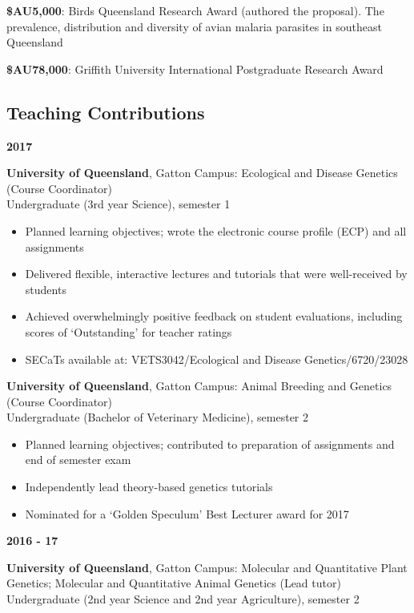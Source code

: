 \documentclass[]{article}
\providecommand{\tightlist}{%
  \setlength{\itemsep}{0pt}\setlength{\parskip}{0pt}}
\begin{document}
\textbf{\$AU5,000}: Birds Queensland Research Award (authored the
proposal). The prevalence, distribution and diversity of avian malaria
parasites in southeast Queensland

\textbf{\$AU78,000}: Griffith University International Postgraduate
Research Award

\subsection{Teaching Contributions}\label{teaching-contributions}

\textbf{2017}

\textbf{University of Queensland}, Gatton Campus: Ecological and Disease
Genetics (Course Coordinator)\\
Undergraduate (3rd year Science), semester 1

\begin{itemize}
\tightlist
\item
  Planned learning objectives; wrote the electronic course profile (ECP)
  and all assignments
\item
  Delivered flexible, interactive lectures and tutorials that were
  well-received by students
\item
  Achieved overwhelmingly positive feedback on student evaluations,
  including scores of `Outstanding' for teacher ratings
\item
  SECaTs available at: VETS3042/Ecological and Disease
  Genetics/6720/23028
\end{itemize}

\textbf{University of Queensland}, Gatton Campus: Animal Breeding and
Genetics (Course Coordinator)\\
Undergraduate (Bachelor of Veterinary Medicine), semester 2

\begin{itemize}
\tightlist
\item
  Planned learning objectives; contributed to preparation of assignments
  and end of semester exam
\item
  Independently lead theory-based genetics tutorials
\item
  Nominated for a `Golden Speculum' Best Lecturer award for 2017
\end{itemize}

\textbf{2016 - 17}

\textbf{University of Queensland}, Gatton Campus: Molecular and
Quantitative Plant Genetics; Molecular and Quantitative Animal Genetics
(Lead tutor)\\
Undergraduate (2nd year Science and 2nd year Agriculture), semester 2
\end{document}
